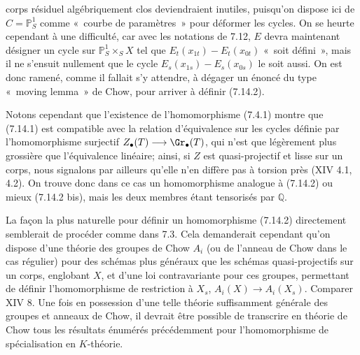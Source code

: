 corps résiduel algébriquement clos deviendraient inutiles, puisqu'on dispose ici de \(C=\mathbb P^1_S\) comme «~courbe de paramètres~» pour déformer les cycles. On se heurte cependant à une difficulté, car avec les notations de 7.12, \(E\) devra maintenant désigner un cycle sur \(\mathbb P^1_S\times_SX\) tel que \(E_t(x_{1t})-E_t(x_{0t})\) «~soit défini~», mais il ne s'ensuit nullement que le cycle \(E_s(x_{1s})-E_s(x_{0s})\) le soit aussi. On est donc ramené, comme il fallait s'y attendre, à dégager un énoncé du type «~moving lemma~» de Chow, pour arriver à définir (7.14.2).

Notons cependant que l'existence de l'homomorphisme (7.4.1) montre que (7.14.1) est compatible avec la relation d'équivalence sur les cycles définie par l'homomorphisme surjectif \(Z_\bullet(T)\longrightarrow \Gr_\bullet(T)\), qui n'est que légèrement plus grossière que l'équivalence linéaire; ainsi, si \(Z\) est quasi-projectif et lisse sur un corps, nous signalons par ailleurs qu'elle n'en diffère pas à torsion près (XIV 4.1, 4.2). On trouve donc dans ce cas un homomorphisme analogue à (7.14.2) ou mieux (7.14.2 bis), mais les deux membres étant tensorisés par \(\mathbb Q\).

La façon la plus naturelle pour définir un homomorphisme (7.14.2) directement semblerait de procéder comme dans 7.3. Cela demanderait cependant qu'on dispose d'une théorie des groupes de Chow \(A_i\) (ou de l'anneau de Chow dans le cas régulier) pour des schémas plus généraux que les schémas quasi-projectifs sur un corps, englobant \(X\), et d'une loi contravariante pour ces groupes, permettant de définir l'homomorphisme de restriction à \(X_s\), \(A_i(X)\longrightarrow A_i(X_s)\). Comparer XIV 8. Une fois en possession d'une telle théorie suffisamment générale des groupes et anneaux de Chow, il devrait être possible de transcrire en théorie de Chow tous les résultats énumérés précédemment pour l'homomorphisme de spécialisation en \(K\)-théorie.

